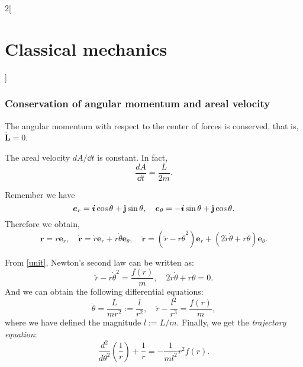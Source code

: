 \documentclass[../../../main.tex]{subfiles}
\begin{document}
\begin{multicols}{2}[\section{Classical mechanics}]
  \subsubsection{Conservation of angular momentum and areal velocity}
  \begin{prop}
    The angular momentum with respect to the center of forces is conserved, that is, $\dot{\boldsymbol{L}}=0$.
  \end{prop}
  \begin{prop}
    The areal velocity $dA/\dd t$ is constant. In fact, $$\frac{dA}{\dd t}=\frac{L}{2m}.$$
  \end{prop}
  \begin{prop}
    Remember we have $$\boldsymbol{e}_r=\boldsymbol{i}\cos\theta+\boldsymbol{\mathrm{j}}\sin\theta,\quad\boldsymbol{e}_\theta=-\boldsymbol{i}\sin\theta+\boldsymbol{\mathrm{j}}\cos\theta.$$ Therefore we obtain,
    \begin{equation}
      \boldsymbol{r}=r\boldsymbol{e}_r,\quad\boldsymbol{\dot{r}}=\dot{r}\boldsymbol{e}_r+r\dot{\theta}\boldsymbol{e}_\theta,\quad\boldsymbol{\ddot{r}}=(\ddot{r}-r\dot{\theta}^2)\boldsymbol{e}_r+(2\dot{r}\dot{\theta}+r\ddot{\theta})\boldsymbol{e}_\theta.
      \label{unit}
    \end{equation}
  \end{prop}
  \begin{prop}
    From \eqref{unit}, Newton's second law can be written as: $$\ddot{r}-r\dot{\theta}^2=\frac{f(r)}{m},\quad 2\dot{r}\dot{\theta}+r\ddot{\theta}=0.$$ And we can obtain the following differential equations: $$\dot{\theta}=\frac{L}{m r^2}:=\frac{l}{r^2},\quad\ddot{r}-\frac{l^2}{r^3}=\frac{f(r)}{m},$$ where we have defined the magnitude $l:=L/m$. Finally, we get the \textit{trajectory equation}: $$\frac{d^2}{d\theta^2}\left(\frac{1}{r}\right)+\frac{1}{r}=-\frac{1}{ml^2}r^2f(r).$$
  \end{prop}

\end{multicols}
\end{document}
